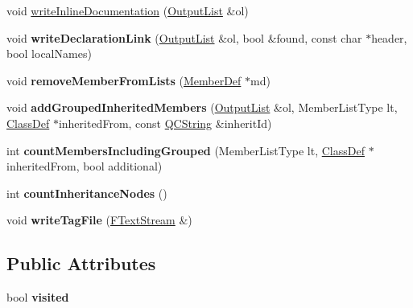 \begin{DoxyCompactItemize}
\item 
void \mbox{\hyperlink{class_class_def_a5c0ec6a3c4ebf12f8c703dbdfdc36e97}{write\+Inline\+Documentation}} (\mbox{\hyperlink{class_output_list}{Output\+List}} \&ol)
\item 
\mbox{\label{class_class_def_acfe84f175c0d9652a6f574281cfbd0e1}} 
void {\bfseries write\+Declaration\+Link} (\mbox{\hyperlink{class_output_list}{Output\+List}} \&ol, bool \&found, const char $\ast$header, bool local\+Names)
\item 
\mbox{\label{class_class_def_ad957ae01f33b8754e9282fe626269a99}} 
void {\bfseries remove\+Member\+From\+Lists} (\mbox{\hyperlink{class_member_def}{Member\+Def}} $\ast$md)
\item 
\mbox{\label{class_class_def_aa6725cc867bb09e18951b95c75b2a7d7}} 
void {\bfseries add\+Grouped\+Inherited\+Members} (\mbox{\hyperlink{class_output_list}{Output\+List}} \&ol, Member\+List\+Type lt, \mbox{\hyperlink{class_class_def}{Class\+Def}} $\ast$inherited\+From, const \mbox{\hyperlink{class_q_c_string}{Q\+C\+String}} \&inherit\+Id)
\item 
\mbox{\label{class_class_def_a03ba89063fd96b9447c3a82c2c442df7}} 
int {\bfseries count\+Members\+Including\+Grouped} (Member\+List\+Type lt, \mbox{\hyperlink{class_class_def}{Class\+Def}} $\ast$inherited\+From, bool additional)
\item 
\mbox{\label{class_class_def_a3b37eb6ab9dc15011f92a450fea26515}} 
int {\bfseries count\+Inheritance\+Nodes} ()
\item 
\mbox{\label{class_class_def_a6e34f3f113b0b1334c2458c05d9b9878}} 
void {\bfseries write\+Tag\+File} (\mbox{\hyperlink{class_f_text_stream}{F\+Text\+Stream}} \&)
\end{DoxyCompactItemize}
\subsection*{Public Attributes}
\begin{DoxyCompactItemize}
\item 
\mbox{\label{class_class_def_a8e46ff4cb96456e7d4c7bdf77aa6c874}} 
bool {\bfseries visited}
\end{DoxyCompactItemize}
